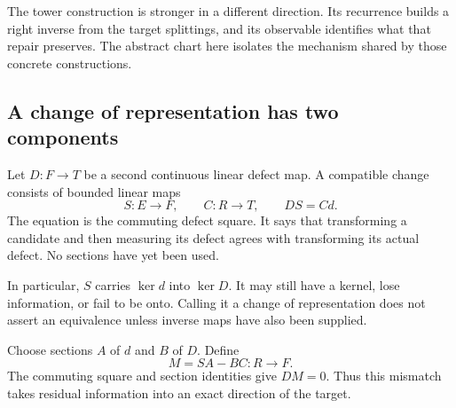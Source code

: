 The tower construction is stronger in a different direction. Its recurrence builds a right inverse from the target splittings, and its observable identifies what that repair preserves. The abstract chart here isolates the mechanism shared by those concrete constructions.

\subsection{A change of representation has two components}
Let \(D:F\to T\) be a second continuous linear defect map. A compatible change consists of bounded linear maps
\[
 S:E\to F,\qquad C:R\to T,\qquad DS=Cd.
\]
The equation is the commuting defect square. It says that transforming a candidate and then measuring its defect agrees with transforming its actual defect. No sections have yet been used.

In particular, \(S\) carries \(\ker d\) into \(\ker D\). It may still have a kernel, lose information, or fail to be onto. Calling it a change of representation does not assert an equivalence unless inverse maps have also been supplied.

Choose sections \(A\) of \(d\) and \(B\) of \(D\). Define
\begin{equation}\label{KS:eq:repair-mismatch}
 M=SA-BC:R\longrightarrow F.
\end{equation}
The commuting square and section identities give \(DM=0\). Thus this mismatch takes residual information into an exact direction of the target.

